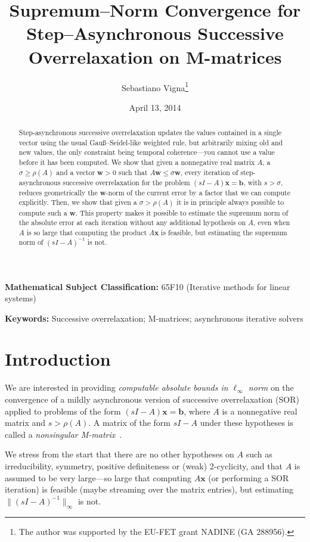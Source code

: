 \documentclass{article}
\date{
April 13, 2014}
\title{Supremum--Norm Convergence for Step--Asynchronous Successive
Overrelaxation on M-matrices}
\author{Sebastiano Vigna\thanks{The author was supported by the EU-FET
grant NADINE (GA 288956).}}
\newcommand{\w}{{\bm w}}
\newcommand{\x}{{\bm x}}
\newcommand{\Gauss}{Gau\ss}
\newcommand{\1}{\mathbf 1}
\begin{document}


\maketitle

\begin{abstract}
Step-asynchronous successive overrelaxation updates the values contained in
a single vector using the usual \Gauss--Seidel-like weighted rule, but 
arbitrarily mixing old and new values, the only constraint being temporal
coherence---you cannot use a value before it has been
computed. We show that given a nonnegative real matrix
$A$, a $\sigma\geq\rho(A)$ and a vector $\w>0$ such that $A\w\leq\sigma\w$, every iteration of
step-asynchronous successive overrelaxation for the problem $(sI- A)\x=\bm
b$, with $s >\sigma$, reduces geometrically the $\w$-norm of the current error
by a factor that we can compute explicitly. Then, we show that given a
$\sigma>\rho(A)$ it is in principle always possible to compute such a $\w$.
This property makes it possible to estimate the supremum norm of the absolute
error at each iteration without any additional hypothesis on $A$, even when $A$
is so large that computing the product $A\bm x$ is feasible, but estimating the
supremum norm of $(sI-A)^{-1}$ is not.
\end{abstract}

\noindent\textbf{Mathematical Subject Classification:} 65F10  	(Iterative
methods for linear systems)

\noindent\textbf{Keywords:} Successive overrelaxation; M-matrices; asynchronous
iterative solvers

\section{Introduction}

We are interested in providing \emph{computable absolute bounds in $\ell_\infty$ norm} 
on the convergence of
a mildly asynchronous version of successive overrelaxation (SOR)
applied to problems of the form $(s  I- A)\bm x = \bm b$, where $A$ is a
nonnegative real matrix and $s >\rho(A)$. A matrix of the form $s  I- A$ under
these hypotheses is called a \emph{nonsingular M-matrix}~\cite{BePNMMS}.

We stress from the start that there are no other hypotheses on $A$ such as
irreducibility, symmetry, positive definiteness or (weak) 2-cyclicity, and that
$A$ is assumed to be very large---so large that computing $A\bm x$ (or
performing a SOR iteration) is feasible (maybe streaming over the matrix
entries), but estimating $\bigl\|(sI-A)^{-1}\bigr\|_\infty$ is not.
\end{document}
